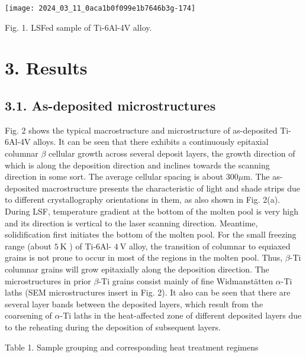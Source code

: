 \documentclass[10pt]{article}
\begin{document}
\begin{center}
\texttt{[image: 2024\_03\_11\_0aca1b0f099e1b7646b3g-174]}
\end{center}

Fig. 1. LSFed sample of Ti-6Al-4V alloy.

\section*{3. Results}
\subsection*{3.1. As-deposited microstructures}
Fig. 2 shows the typical macrostructure and microstructure of as-deposited Ti-6Al-4V alloys. It can be seen that there exhibits a continuously epitaxial columnar $\beta$ cellular growth across several deposit layers, the growth direction of which is along the deposition direction and inclines towards the scanning direction in some sort. The average cellular spacing is about $300 \mu \mathrm{m}$. The as-deposited macrostructure presents the characteristic of light and shade strips due to different crystallography orientations in them, as also shown in Fig. 2(a). During LSF, temperature gradient at the bottom of the molten pool is very high and its direction is vertical to the laser scanning direction. Meantime, solidification first initiates the bottom of the molten pool. For the small freezing range (about $5 \mathrm{~K}$ ) of Ti-6Al- $4 \mathrm{~V}$ alloy, the transition of columnar to equiaxed grains is not prone to occur in most of the regions in the molten pool. Thus, $\beta$-Ti columnar grains will grow epitaxially along the deposition direction. The microstructures in prior $\beta$-Ti grains consist mainly of fine Widmanstätten $\alpha$-Ti laths (SEM microstructures insert in Fig. 2). It also can be seen that there are several layer bands between the deposited layers, which result from the coarsening of $\alpha$-Ti laths in the heat-affected zone of different deposited layers due to the reheating during the deposition of subsequent layers.

Table 1. Sample grouping and corresponding heat treatment regimens
\end{document}
